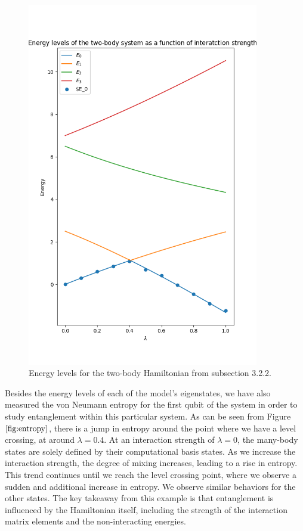 \documentclass[onecolumn,10pt,cleanfoot]{asme2ej}
\begin{document}
\begin{figure}[H]
  \centering
  \includegraphics[width=0.9\textwidth, height=0.75\textwidth]{figures/VQE_vs_Analytical_2qubits.png}
  \caption{Energy levels for the two-body Hamiltonian from subsection 3.2.2.}
  \label{fig:ex3}
\end{figure}

Besides the energy levels of each of the model's eigenstates, we have also measured the von Neumann entropy for the first qubit of the system in order to study entanglement within this particular system. As can be seen from Figure $\ref{fig:entropy}$, there is a jump in entropy around the point where we have a level crossing, at around $\lambda=0.4$. At an interaction strength of $\lambda=0$, the many-body states are solely defined by their computational basis states. As we increase the interaction strength, the degree of mixing increases, leading to a rise in entropy. This trend continues until we reach the level crossing point, where we observe a sudden and additional increase in entropy. We observe similar behaviors for the other states. The key takeaway from this example is that entanglement is influenced by the Hamiltonian itself, including the strength of the interaction matrix elements and the non-interacting energies.
\end{document}
